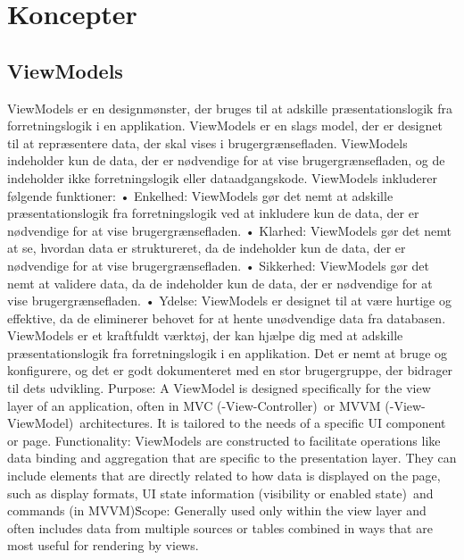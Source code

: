 \section{Koncepter}

\subsection{ViewModels}
ViewModels er en designmønster, der bruges til at adskille præsentationslogik fra forretningslogik i en applikation. ViewModels er en slags model, der er designet til at repræsentere data, der skal vises i brugergrænsefladen. ViewModels indeholder kun de data, der er nødvendige for at vise brugergrænsefladen, og de indeholder ikke forretningslogik eller dataadgangskode.
ViewModels inkluderer følgende funktioner:
•	Enkelhed: ViewModels gør det nemt at adskille præsentationslogik fra forretningslogik ved at inkludere kun de data, der er nødvendige for at vise brugergrænsefladen.
•	Klarhed: ViewModels gør det nemt at se, hvordan data er struktureret, da de indeholder kun de data, der er nødvendige for at vise brugergrænsefladen.
•	Sikkerhed: ViewModels gør det nemt at validere data, da de indeholder kun de data, der er nødvendige for at vise brugergrænsefladen.
•	Ydelse: ViewModels er designet til at være hurtige og effektive, da de eliminerer behovet for at hente unødvendige data fra databasen.
ViewModels er et kraftfuldt værktøj, der kan hjælpe dig med at adskille præsentationslogik fra forretningslogik i en applikation. Det er nemt at bruge og konfigurere, og det er godt dokumenteret med en stor brugergruppe, der bidrager til dets udvikling.
Purpose: A ViewModel is designed specifically for the view layer of an application, often in MVC (\Model-View-Controller)\ or MVVM (\Model-View-ViewModel)\ architectures. It is tailored to the needs of a specific UI component or page.
Functionality: ViewModels are constructed to facilitate operations like data binding and aggregation that are specific to the presentation layer. 
They can include elements that are directly related to how data is displayed on the page, such as display formats, UI state information (\like visibility or enabled state)\, and commands (\particularly in MVVM)\.
Scope: Generally used only within the view layer and often includes data from multiple sources or tables combined in ways that are most useful for rendering by views.

